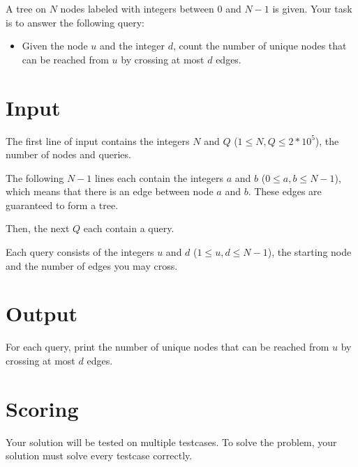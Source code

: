 A tree on $N$ nodes labeled with integers between $0$ and $N-1$ is given. Your task is to answer the following query:

\begin{itemize}
    \item Given the node $u$ and the integer $d$, count the number of unique nodes that can be reached from $u$ by
    crossing at most $d$ edges.
\end{itemize}

\section*{Input}
The first line of input contains the integers $N$ and $Q$ ($1 \leq N,Q \leq 2*10^5$), the number of nodes and queries.

The following $N-1$ lines each contain the integers $a$ and $b$ ($0 \leq a,b \leq N-1$), which means that
there is an edge between node $a$ and $b$. These edges are guaranteed to form a tree.

Then, the next $Q$ each contain a query. 

Each query consists of the integers $u$ and $d$ ($1 \leq u,d \leq N-1$), the starting node and the number of edges
you may cross.

\section*{Output}
For each query, print the number of unique nodes that can be reached from $u$ by crossing at most $d$ edges.

\section*{Scoring}
Your solution will be tested on multiple testcases.
\noindent
To solve the problem, your solution must solve every testcase correctly.
